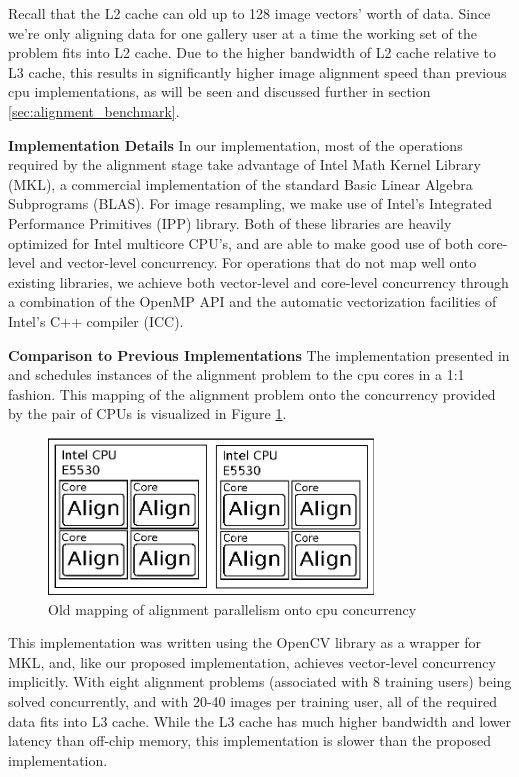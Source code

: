 \documentclass[10pt,twocolumn,letterpaper]{article}
\begin{document}
Recall that the L2 cache can old up to 128 image vectors' worth of data.  Since
we're only aligning data for one gallery user at a time the working set of the
problem fits into L2 cache.  Due to the higher bandwidth of L2 cache relative
to L3 cache, this results in significantly higher image alignment speed than
previous cpu implementations, as will be seen and discussed further in section
\ref{sec:alignment_benchmark}.

{\bf Implementation Details} In our implementation, most of the operations
required by the alignment stage take advantage of Intel Math Kernel Library
(MKL), a commercial implementation of the standard Basic Linear Algebra
Subprograms (BLAS).  For image resampling, we make use of Intel's Integrated
Performance Primitives (IPP) library.  Both of these libraries are heavily
optimized for Intel multicore CPU's, and are able to make good use of both
core-level and vector-level concurrency.  For operations that do not map well
onto existing libraries, we achieve both vector-level and core-level
concurrency through a combination of the OpenMP API \cite{dagum2002openmp} and
the automatic vectorization facilities of Intel's C++ compiler
(ICC)\cite{dulong1999overview}.

{\bf Comparison to Previous Implementations} The implementation presented in
\cite{WagnerA2009-CVPR} and \cite{WagnerA2011-PAMI} schedules instances of the
alignment problem to the cpu cores in a 1:1 fashion.  
This mapping of the alignment problem onto the concurrency provided by the pair
of CPUs is visualized in Figure \ref{fig:alignment_mapping_old}.
\begin{figure}
\centering
\includegraphics[width=3.4in]{figures/alignment_mapping_old}
\caption{Old mapping of alignment parallelism onto cpu concurrency}
\label{fig:alignment_mapping_old}
\end{figure}

This implementation was written using the OpenCV library
as a wrapper for MKL, and, like our proposed implementation, achieves vector-level concurrency implicitly.  
With eight alignment problems (associated with 8 training users) being solved
concurrently, and with 20-40 images per training user, all of the required data
fits into L3 cache.  While the L3 cache has much higher bandwidth and lower latency
than off-chip memory, this implementation is slower than the proposed implementation.
\end{document}

